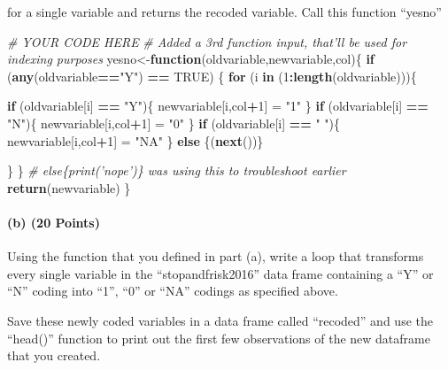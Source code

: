 \documentclass[]{article}
\newenvironment{Shaded}{\begin{snugshade}}{\end{snugshade}}
\newcommand{\CommentTok}[1]{\textcolor[rgb]{0.56,0.35,0.01}{\textit{#1}}}
\newcommand{\ControlFlowTok}[1]{\textcolor[rgb]{0.13,0.29,0.53}{\textbf{#1}}}
\newcommand{\DecValTok}[1]{\textcolor[rgb]{0.00,0.00,0.81}{#1}}
\newcommand{\KeywordTok}[1]{\textcolor[rgb]{0.13,0.29,0.53}{\textbf{#1}}}
\newcommand{\NormalTok}[1]{#1}
\newcommand{\OperatorTok}[1]{\textcolor[rgb]{0.81,0.36,0.00}{\textbf{#1}}}
\newcommand{\OtherTok}[1]{\textcolor[rgb]{0.56,0.35,0.01}{#1}}
\newcommand{\StringTok}[1]{\textcolor[rgb]{0.31,0.60,0.02}{#1}}
\let\oldparagraph\paragraph
\renewcommand{\paragraph}[1]{\oldparagraph{#1}\mbox{}}
\begin{document}
for a single variable and returns the recoded variable. Call this
function ``yesno''

\begin{Shaded}
\begin{Highlighting}[]
\CommentTok{# YOUR CODE HERE }
\CommentTok{# Added a 3rd function input, that'll be used for indexing purposes}
\NormalTok{yesno<-}\ControlFlowTok{function}\NormalTok{(oldvariable,newvariable,col)\{}
   \ControlFlowTok{if}\NormalTok{ (}\KeywordTok{any}\NormalTok{(oldvariable}\OperatorTok{==}\StringTok{"Y"}\NormalTok{) }\OperatorTok{==}\StringTok{ }\OtherTok{TRUE}\NormalTok{) \{}
      \ControlFlowTok{for}\NormalTok{ (i }\ControlFlowTok{in}\NormalTok{ (}\DecValTok{1}\OperatorTok{:}\KeywordTok{length}\NormalTok{(oldvariable)))\{}
        
        \ControlFlowTok{if}\NormalTok{ (oldvariable[i] }\OperatorTok{==}\StringTok{ "Y"}\NormalTok{)\{}
\NormalTok{        newvariable[i,col}\OperatorTok{+}\DecValTok{1}\NormalTok{] =}\StringTok{ "1"}
\NormalTok{        \}}
        \ControlFlowTok{if}\NormalTok{ (oldvariable[i] }\OperatorTok{==}\StringTok{ "N"}\NormalTok{)\{}
\NormalTok{        newvariable[i,col}\OperatorTok{+}\DecValTok{1}\NormalTok{] =}\StringTok{ "0"}
\NormalTok{        \}}
        \ControlFlowTok{if}\NormalTok{ (oldvariable[i] }\OperatorTok{==}\StringTok{ " "}\NormalTok{)\{}
\NormalTok{        newvariable[i,col}\OperatorTok{+}\DecValTok{1}\NormalTok{] =}\StringTok{ "NA"} 
\NormalTok{        \}}
        \ControlFlowTok{else}\NormalTok{ \{(}\ControlFlowTok{next}\NormalTok{())\}}

\NormalTok{      \}}
\NormalTok{    \}}
  \CommentTok{# else\{print('nope')\} was using this to troubleshoot earlier}
  \KeywordTok{return}\NormalTok{(newvariable)}
\NormalTok{\}}
\end{Highlighting}
\end{Shaded}

\hypertarget{b-20-points}{%
\paragraph{(b) (20 Points)}\label{b-20-points}}

Using the function that you defined in part (a), write a loop that
transforms every single variable in the ``stopandfrisk2016'' data frame
containing a ``Y'' or ``N'' coding into ``1'', ``0'' or ``NA'' codings
as specified above.

Save these newly coded variables in a data frame called ``recoded'' and
use the ``head()'' function to print out the first few observations of
the new dataframe that you created.
\end{document}
